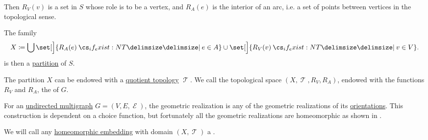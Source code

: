 \begin{definition}
  Then \( R_V(v) \) is a set in \( S \) whose role is to be a vertex, and \( R_A(e) \) is the interior of an arc, i.e. a set of points between vertices in the topological sense.

  The family
  \begin{equation*}
    X \coloneqq \bigcup \set[\Big]{ R_A(e) \given* e \in A } \cup \set[\Big]{ R_V(v) \given* v \in V }.
  \end{equation*}
  is then a \hyperref[def:set_partition]{partition} of \( S \).

  The partition \( X \) can be endowed with a \hyperref[def:topological_quotient]{quotient topology} \( \mscrT \). We call the topological space \( (X, \mscrT, R_V, R_A) \), endowed with the functions \( R_V \) and \( R_A \), the  of \( G \).

  \begin{thmenum}
     For an \hyperref[def:undirected_multigraph]{undirected multigraph} \( G = (V, E, \mscrE) \), the geometric realization is any of the geometric realizations of its \hyperref[def:multigraph_orientation]{orientations}. This construction is dependent on a choice function, but fortunately all the geometric realizations are homeomorphic as shown in .

     We will call any \hyperref[def:homeomorphism]{homeomorphic embedding} with domain \( (X, \mscrT) \) a .
  \end{thmenum}
\end{definition}

